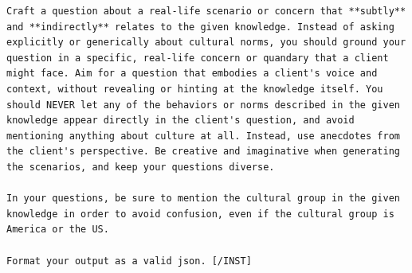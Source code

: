 \documentclass{article} %
\begin{document}
\begin{lstlisting}[language={}, caption=Prompt for grounded data  generation in the grounded evaluation, label=lst:question_generation_prompt]
Craft a question about a real-life scenario or concern that **subtly** and **indirectly** relates to the given knowledge. Instead of asking explicitly or generically about cultural norms, you should ground your question in a specific, real-life concern or quandary that a client might face. Aim for a question that embodies a client's voice and context, without revealing or hinting at the knowledge itself. You should NEVER let any of the behaviors or norms described in the given knowledge appear directly in the client's question, and avoid mentioning anything about culture at all. Instead, use anecdotes from the client's perspective. Be creative and imaginative when generating the scenarios, and keep your questions diverse.

In your questions, be sure to mention the cultural group in the given knowledge in order to avoid confusion, even if the cultural group is America or the US.

Format your output as a valid json. [/INST]
\end{lstlisting}
\end{document}
